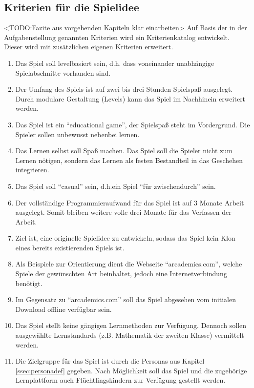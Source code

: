 \subsection{Kriterien für die Spielidee}\label{ssec:kriterien}
	<TODO:Fazite aus vorgehenden Kapiteln klar einarbeiten>
	Auf Basis der in der Aufgabenstellung genannten Kriterien wird ein Kriterienkatalog entwickelt. Dieser wird mit zusätzlichen eigenen Kriterien erweitert.
	\begin{enumerate}
		\item{Das Spiel soll levelbasiert sein, d.h. dass voneinander unabhängige Spielabschnitte vorhanden sind.}
		\item{Der Umfang des Spiels ist auf zwei bis drei Stunden Spielspaß ausgelegt. Durch modulare Gestaltung (Levels) kann das Spiel im Nachhinein erweitert werden.}
		\item{Das Spiel ist ein \enquote{educational game}, der Spielspaß steht im Vordergrund. Die Spieler sollen unbewusst nebenbei lernen.}
		\item{Das Lernen selbst soll Spaß machen. Das Spiel soll die Spieler nicht zum Lernen nötigen, sondern das Lernen als festen Bestandteil in das Geschehen integrieren.}
		\item{Das Spiel soll \enquote{casual} sein, d.h.\@ ein Spiel \enquote{für zwischendurch} sein.}
		\item{Der vollständige Programmieraufwand für das Spiel ist auf 3 Monate Arbeit ausgelegt. Somit bleiben weitere volle drei Monate für das Verfassen der Arbeit.}
		\item{Ziel ist, eine originelle Spielidee zu entwickeln, sodass das Spiel kein Klon eines bereits existierenden Spiels ist.}
		\item{Als Beispiele zur Orientierung dient die Webseite \enquote{arcademics.com}, welche Spiele der gewünschten Art beinhaltet, jedoch eine Internetverbindung benötigt. }
		\item{Im Gegensatz zu \enquote{arcademics.com} soll das Spiel abgesehen vom initialen Download offline verfügbar sein.}
		\item{Das Spiel stellt keine gängigen Lernmethoden zur Verfügung. Dennoch sollen ausgewählte Lernstandards (z.B. Mathematik der zweiten Klasse) vermittelt werden.}
		\item{Die Zielgruppe für das Spiel ist durch die Personas aus Kapitel \ref{ssec:personadef} gegeben. Nach Möglichkeit soll das Spiel und die zugehörige Lernplattform auch Flüchtlingskindern zur Verfügung gestellt werden.}
	\end{enumerate}

